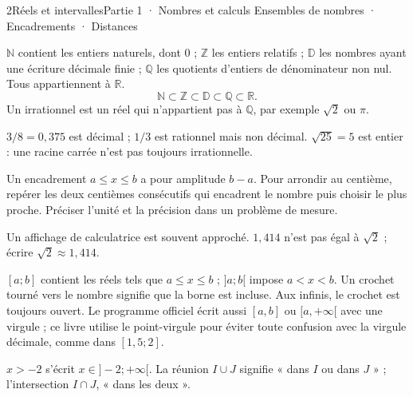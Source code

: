\begin{ouverture}[ensembles]{2}{Réels et intervalles}{Partie 1 · Nombres et calculs}
{Ensembles de nombres · Encadrements · Distances}
\end{ouverture}
\pagestyle{otMain}\essentiel\fontsize{11}{15}\selectfont
{}
\begin{definition}
$\mathbb N$ contient les entiers naturels, dont 0 ; $\mathbb Z$ les entiers relatifs ; $\mathbb D$ les nombres ayant une écriture décimale finie ; $\mathbb Q$ les quotients d’entiers de dénominateur non nul. Tous appartiennent à $\mathbb R$.
\[\mathbb N\subset\mathbb Z\subset\mathbb D\subset\mathbb Q\subset\mathbb R.\]
Un irrationnel est un réel qui n’appartient pas à $\mathbb Q$, par exemple $\sqrt2$ ou $\pi$.
\end{definition}
\begin{exemple}$3/8=0{,}375$ est décimal ; $1/3$ est rationnel mais non décimal. $\sqrt{25}=5$ est entier : une racine carrée n’est pas toujours irrationnelle.\end{exemple}
\begin{savoirfaire}
Un encadrement $a\le x\le b$ a pour amplitude $b-a$. Pour arrondir au centième, repérer les deux centièmes consécutifs qui encadrent le nombre puis choisir le plus proche. Préciser l’unité et la précision dans un problème de mesure.
\end{savoirfaire}
\begin{attention}Un affichage de calculatrice est souvent approché. $1{,}414$ n’est pas égal à $\sqrt2$ ; écrire $\sqrt2\approx1{,}414$.\end{attention}
\clearpage
{}
\begin{definition}
$[a;b]$ contient les réels tels que $a\le x\le b$ ; $]a;b[$ impose $a<x<b$. Un crochet tourné vers le nombre signifie que la borne est incluse. Aux infinis, le crochet est toujours ouvert. Le programme officiel écrit aussi $[a,b]$ ou $[a,+\infty[$ avec une virgule ; ce livre utilise le point-virgule pour éviter toute confusion avec la virgule décimale, comme dans $[1{,}5;2]$.
\end{definition}
\begin{exemple}$x>-2$ s’écrit $x\in]-2;+\infty[$. La réunion $I\cup J$ signifie « dans $I$ ou dans $J$ » ; l’intersection $I\cap J$, « dans les deux ».\end{exemple}
